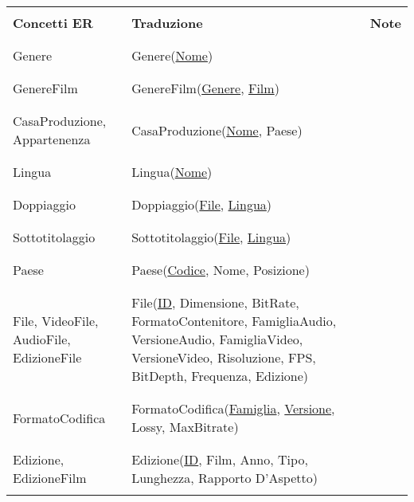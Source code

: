 \documentclass{article}
\begin{document}
\begin{tabular}{|C{2.7cm}|C{8cm}|C{0.8cm}|}
\hline
& & \\
    \textbf{Concetti ER} & \textbf{Traduzione} & \textbf{Note} \\
& & \\
\hline
& & \\
    Genere & Genere(\underline{Nome}) & \\
& & \\
\hline
& & \\
    GenereFilm & GenereFilm(\underline{Genere}, \underline{Film}) & \\
& & \\
\hline
& & \\
    CasaProduzione, Appartenenza & CasaProduzione(\underline{Nome}, Paese) & \\ 
& & \\
\hline 
& & \\
    Lingua & Lingua(\underline{Nome}) & \\ 
& & \\
\hline 
& & \\
    Doppiaggio & Doppiaggio(\underline{File}, \underline{Lingua}) & \\ 
& & \\
\hline 
& & \\
    Sottotitolaggio & Sottotitolaggio(\underline{File}, \underline{Lingua}) & \\
& & \\
\hline
& & \\
    Paese & Paese(\underline{Codice}, Nome, Posizione) & \\
& & \\
\hline
& & \\
    File, VideoFile, AudioFile, EdizioneFile & File(\underline{ID}, Dimensione, BitRate, FormatoContenitore, FamigliaAudio, VersioneAudio, FamigliaVideo, VersioneVideo, Risoluzione, FPS, BitDepth, Frequenza, Edizione) & \\
& & \\
\hline 
& & \\
    FormatoCodifica & FormatoCodifica(\underline{Famiglia}, \underline{Versione}, Lossy, MaxBitrate) & \\
& & \\
\hline 
& & \\
    Edizione, EdizioneFilm & Edizione(\underline{ID}, Film, Anno, Tipo, Lunghezza, Rapporto D'Aspetto) & \\ 
& & \\
\hline 
\end{tabular} \\ \\
\end{document}
